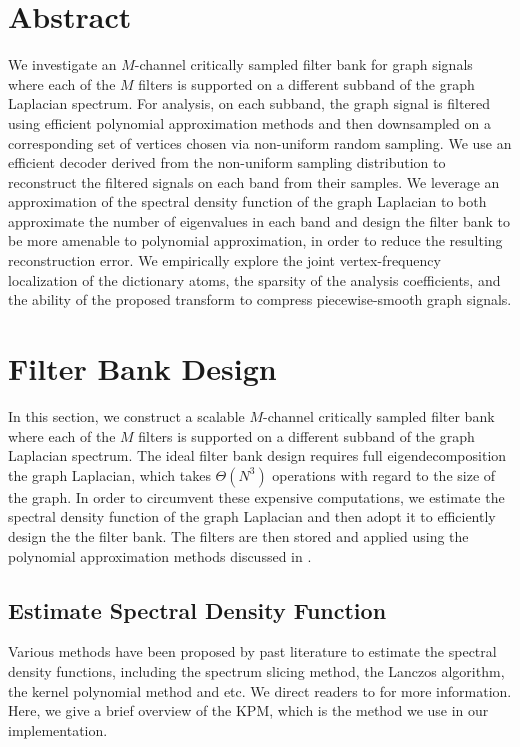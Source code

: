 \documentclass[a4paper]{article}
\theoremstyle{definition}
\begin{document}
\newpage

\section{Abstract}
     We investigate an $M$-channel critically sampled filter bank for graph signals where each of the $M$ filters is supported on a different subband of the graph Laplacian spectrum. For analysis, on each subband, the graph signal is filtered using efficient polynomial approximation methods and then downsampled on a corresponding set of vertices chosen via non-uniform random sampling. We use an efficient decoder derived from the non-uniform sampling distribution to reconstruct the filtered signals on each band from their samples. We leverage an approximation of the spectral density function of the graph Laplacian to both approximate the number of eigenvalues in each band and design the filter bank to be more amenable to polynomial approximation, in order to reduce the resulting reconstruction error. We empirically explore the joint vertex-frequency localization of the dictionary atoms, the sparsity of the analysis coefficients, and the ability of the proposed transform to compress piecewise-smooth graph signals. 



\section{Filter Bank Design}

In this section, we construct a scalable $M$-channel critically sampled filter bank where each of the $M$ filters is supported on a different subband of the graph Laplacian spectrum. The ideal filter bank design requires full eigendecomposition the graph Laplacian, which takes $\Theta(N^3)$ operations with regard to the size of the graph. In order to circumvent these expensive computations, we estimate the spectral density function of the graph Laplacian and then adopt it to efficiently design the the filter bank. The filters are then stored and applied using the polynomial approximation methods discussed in \cite{hammond2011wavelets, shuman_DCOSS_2011}. 

\subsection{Estimate Spectral Density Function}

Various methods have been proposed by past literature to estimate the spectral density functions, including the spectrum slicing method\cite{hammond2011wavelets,shuman_DCOSS_2011}, the Lanczos algorithm, the kernel polynomial method \cite{approximating spectral densities of large matrices} and etc. We direct readers to \cite{} for more information. Here, we give a brief overview of the KPM, which is the method we use in our implementation.
\end{document}

